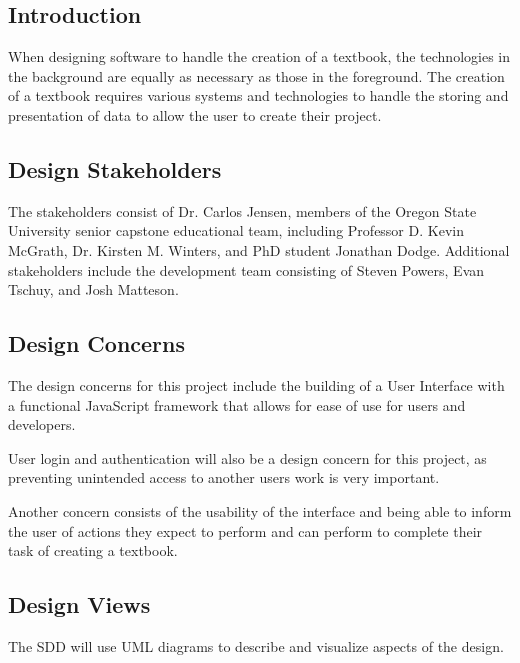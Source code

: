 \documentclass[letterpaper, 10pt, draftclsnofoot, compsoc, onecolumn]{IEEEtran}
\begin{document}
\subsection{Introduction}
{\noindent When designing software to handle the creation of a textbook, 
the technologies in the background are equally as necessary as those in the foreground. 
The creation of a textbook requires various systems and technologies to handle 
the storing and presentation of data to allow the user to create their project.\par}


\subsection{Design Stakeholders}
{\noindent The stakeholders consist of Dr. Carlos Jensen, members of the Oregon 
State University senior capstone educational team, including Professor D. Kevin McGrath, 
Dr. Kirsten M. Winters, and PhD student Jonathan Dodge. 
Additional stakeholders include the development team consisting of Steven Powers, 
Evan Tschuy, and Josh Matteson.\par}

\subsection{Design Concerns}
{\noindent The design concerns for this project include the building of a User Interface 
with a functional JavaScript framework that allows for ease of use for users and developers. 

User login and authentication will also be a design concern for this project, 
as preventing unintended access to another users work is very important.

Another concern consists of the usability of the interface and being able 
to inform the user of actions they expect to perform and can perform to 
complete their task of creating a textbook. \par}

\subsection{Design Views}
{\noindent The SDD will use UML diagrams to describe and visualize aspects of the design. \par}
\end{document}

